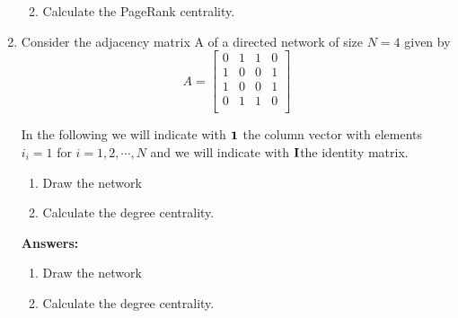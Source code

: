 \documentclass{amsart}
\theoremstyle{definition}
\theoremstyle{remark}
\numberwithin{equation}{section}
\begin{document}
\begin{enumerate}
\begin{enumerate}
\vspace{0.2cm}
\item Calculate the PageRank centrality. \vspace{0.2cm}


\end{enumerate}
\clearpage

\item 
Consider the adjacency matrix A of a directed network of size $N = 4$ given by \vspace{0.2cm}
\begin{equation*}
{A}  = \left\lbrack\begin{array}{cccc}
0 & 1 & 1 & 0 \\
1 & 0 & 0 & 1 \\
1 & 0 & 0 & 1 \\
0 & 1 & 1 & 0 \\
\end{array}\right\rbrack
\end{equation*}

\vspace{0.2cm}
In the following we will indicate with ${\bf 1}$ the column vector with elements $i_i = 1$ for $i = 1, 2, \cdots, N$ and we will indicate with ${\bf I}$the identity matrix. \vspace{0.2cm}
\begin{enumerate}
\item Draw the network
\item Calculate the degree centrality.
\end{enumerate}
\vspace{1cm}

\textbf{Answers:}

\begin{enumerate}
\item Draw the network \vspace{0.2cm}

\vspace{0.2cm}
\item Calculate the degree centrality. \vspace{0.2cm}

\vspace{0.2cm}
\end{enumerate}
\clearpage


\end{enumerate}
\end{document}
